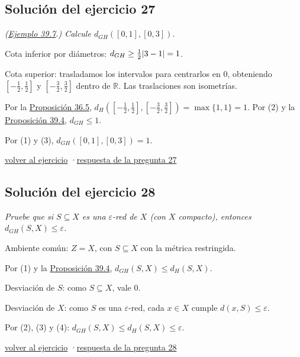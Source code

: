 \documentclass[11pt,a4paper]{article}
\newcommand{\R}{\mathbb{R}}\newcommand{\N}{\mathbb{N}}\newcommand{\Q}{\mathbb{Q}}
\begin{document}
\subsection*{\hypertarget{s-27}{}Solución del ejercicio 27}
\emph{(\href{https://decostruttivismo.github.io/MAT2514-repaso/pdf/MAT2514_apuntes_completos.pdf\#nameddest=teorema.39.7}{Ejemplo 39.7}.) Calcule $d_{GH}([0,1],[0,3])$.}
\begin{pasos}
\item[(1)] Cota inferior por diámetros: $d_{GH}\ge\frac12\lvert 3-1\rvert=1$.
\item[(2)] Cota superior: trasladamos los intervalos para centrarlos en $0$, obteniendo $[-\frac12,\frac12]$ y $[-\frac32,\frac32]$ dentro de $\R$. Las traslaciones son isometrías.
\item[(3)] Por la \href{https://decostruttivismo.github.io/MAT2514-repaso/pdf/MAT2514_apuntes_completos.pdf\#nameddest=teorema.36.5}{Proposición 36.5}, $d_H([-\frac12,\frac12],[-\frac32,\frac32])=\max\{1,1\}=1$. Por (2) y la \href{https://decostruttivismo.github.io/MAT2514-repaso/pdf/MAT2514_apuntes_completos.pdf\#nameddest=teorema.39.4}{Proposición 39.4}, $d_{GH}\le1$.
\item[] Por (1) y (3), $d_{GH}([0,1],[0,3])=1$.
\end{pasos}
\par{\small \hyperlink{x-27}{volver al ejercicio} \quad·\quad \hyperlink{r-27}{respuesta de la pregunta 27}}
\subsection*{\hypertarget{s-28}{}Solución del ejercicio 28}
\emph{Pruebe que si $S\subseteq X$ es una $\varepsilon$-red de $X$ (con $X$ compacto), entonces $d_{GH}(S,X)\le\varepsilon$.}
\begin{pasos}
\item[(1)] Ambiente común: $Z=X$, con $S\subseteq X$ con la métrica restringida.
\item[(2)] Por (1) y la \href{https://decostruttivismo.github.io/MAT2514-repaso/pdf/MAT2514_apuntes_completos.pdf\#nameddest=teorema.39.4}{Proposición 39.4}, $d_{GH}(S,X)\le d_H(S,X)$.
\item[(3)] Desviación de $S$: como $S\subseteq X$, vale $0$.
\item[(4)] Desviación de $X$: como $S$ es una $\varepsilon$-red, cada $x\in X$ cumple $d(x,S)\le\varepsilon$.
\item[] Por (2), (3) y (4): $d_{GH}(S,X)\le d_H(S,X)\le\varepsilon$.
\end{pasos}
\par{\small \hyperlink{x-28}{volver al ejercicio} \quad·\quad \hyperlink{r-28}{respuesta de la pregunta 28}}
\end{document}

